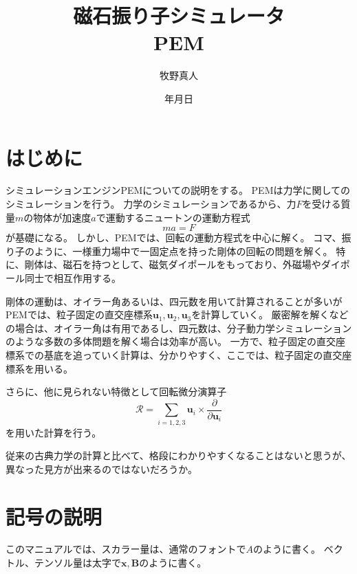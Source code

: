\documentclass[a4paper,11pt]{jbook}
\title{磁石振り子シミュレータ\\PEM}
\author{牧野真人}
\date{\number\year 年\number\month 月\number\day 日}
\def\vecR {\bm {\mathcal {R} } }
\begin{document}
\maketitle
\tableofcontents 
\chapter{はじめに}
シミュレーションエンジンPEMについての説明をする。
PEMは力学に関してのシミュレーションを行う。
力学のシミュレーションであるから、力$F$を受ける質量$m$の物体が加速度$a$で運動するニュートンの運動方程式
\begin{equation}
ma=F
\end{equation}
が基礎になる。
しかし、PEMでは、回転の運動方程式を中心に解く。
コマ、振り子のように、一様重力場中で一固定点を持った剛体の回転の問題を解く。
特に、剛体は、磁石を持つとして、磁気ダイポールをもっており、外磁場やダイポール同士で相互作用する。

剛体の運動は、オイラー角あるいは、四元数を用いて計算されることが多いがPEMでは、粒子固定の直交座標系$\bm{u}_1,\bm{u}_2,\bm{u}_3$を計算していく。
厳密解を解くなどの場合は、オイラー角は有用であるし、四元数は、分子動力学シミュレーションのような多数の多体問題を解く場合は効率が高い。
一方で、粒子固定の直交座標系での基底を追っていく計算は、分かりやすく、ここでは、粒子固定の直交座標系を用いる。

さらに、他に見られない特徴として回転微分演算子
\begin{equation}
\vecR =\sum_{i=1,2,3}\bm{u}_i\times\frac{\partial}{\partial \bm{u}_i}
\end{equation}
を用いた計算を行う。

従来の古典力学の計算と比べて、格段にわかりやすくなることはないと思うが、異なった見方が出来るのではないだろうか。
\chapter{記号の説明}
このマニュアルでは、スカラー量は、通常のフォントで$A$のように書く。
ベクトル、テンソル量は太字で$\bm{x},\bm{B}$のように書く。
\end{document}

